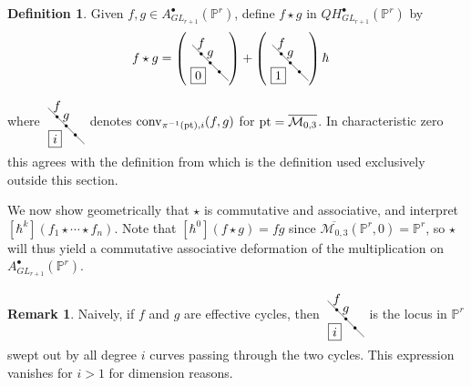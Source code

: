 \documentclass[12pt]{amsart}
\newcommand{\mb}{\mathbb}
\newcommand{\ol}{\overline}
\newcommand{\pt}{{\rm pt}}
\newcommand{\MM}{{\mathcal M}}
\newcommand{\conv}{{\operatorname{conv}}}
\theoremstyle{plain}
\theoremstyle{definition}
\newtheorem{Def}{Definition}[section]
\newtheorem{Rem}[Thm]{Remark}
\theoremstyle{remark}
\begin{document}
\begin{Def}
\label{QCD}
Given $f,g\in A^\bullet_{GL_{r+1}}(\mb{P}^r)$, define $f\star g$ in $QH^\bullet_{GL_{r+1}}(\mb{P}^r)$ by
\begin{align*}
f\star g&=
\left(\tikz[baseline=15pt]{ \draw(1,0)--(0,1);\filldraw[black] (1/4,3/4) circle (1pt) node[anchor=south]{$f$}; \filldraw[black] (1/2,1/2) circle (1pt) node[anchor=south]{$g$} node[anchor=north east]{$\boxed 0$};\filldraw[black] (3/4,1/4) circle (1pt) node[anchor=south]{$$}}\right) +
\left(\tikz[baseline=15pt]{\draw(1,0)--(0,1);\filldraw[black] (1/4,3/4) circle (1pt) node[anchor=south]{$f$}; \filldraw[black] (1/2,1/2) circle (1pt) node[anchor=south]{$g$} node[anchor=north east]{\boxed 1};\filldraw[black] (3/4,1/4) circle (1pt) node[anchor=south]{$$}}\right) \hbar
\end{align*}
where $\tikz[baseline=15pt]{\draw(1,0)--(0,1);\filldraw[black] (1/4,3/4) circle (1pt) node[anchor=south]{$f$}; \filldraw[black] (1/2,1/2) circle (1pt) node[anchor=south]{$g$} node[anchor=north east]{\boxed i};\filldraw[black] (3/4,1/4) circle (1pt) node[anchor=south]{$$}}$ denotes $\conv_{\pi^{-1}(\pt),i}(f,g)$ for $\pt=\ol{\MM_{0,3}}$. In characteristic zero this agrees with the definition from  which is the definition used exclusively outside this section.
\end{Def}

We now show geometrically that $\star$ is commutative and associative, and interpret $[\hbar^k](f_1\star \cdots \star f_n)$. Note that $[\hbar^0](f \star g)=fg$ since $\ol{\MM_{0,3}}(\mb{P}^r,0)=\mb{P}^r$, so $\star$ will thus yield a commutative associative deformation of the multiplication on $A^\bullet_{GL_{r+1}}(\mb{P}^r)$.

\begin{Rem}
Naively, if $f$ and $g$ are effective cycles, then $\tikz[baseline=15pt]{\draw(1,0)--(0,1);\filldraw[black] (1/4,3/4) circle (1pt) node[anchor=south]{$f$}; \filldraw[black] (1/2,1/2) circle (1pt) node[anchor=south]{$g$} node[anchor=north east]{\boxed i};\filldraw[black] (3/4,1/4) circle (1pt) node[anchor=south]{$$}}$ is the locus in $\mb{P}^r$ swept out by all degree $i$ curves passing through the two cycles. This expression vanishes for $i>1$ for dimension reasons. 
\end{Rem}
\end{document}
